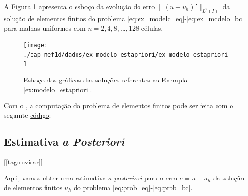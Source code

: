 \begin{ex}\label{ex:modelo_estapriori}
  A Figura \ref{fig:ex_modelo_estapriori} apresenta o esboço da evolução do erro $\|(u - u_h)'\|_{L^2(I)}$ da solução de elementos finitos do problema \eqref{eq:ex_modelo_eq}-\eqref{eq:ex_modelo_bc} para malhas uniformes com $n=2, 4, 8, \ldots, 128$ células.

\begin{figure}[h!]
  \centering
  \texttt{[image: ./cap\_mef1d/dados/ex\_modelo\_estapriori/ex\_modelo\_estapriori]}
  \caption{Esboço dos gráficos das soluções referentes ao Exemplo \ref{ex:modelo_estapriori}.}
  \label{fig:ex_modelo_estapriori}
\end{figure}

\ifispython
Com o \fenics, a computação do problema de elementos finitos pode ser feita com o seguinte \href{https://github.com/phkonzen/notas/blob/master/src/MetodoElementosFinitos/cap_mef1d/dados/ex_modelo_estapriori/ex_modelo_estapriori.py}{código}:

\fi
\end{ex}

\subsection{Estimativa \textit{a Posteriori}}
[[tag:revisar]]

Aqui, vamos obter uma estimativa \textit{a posteriori} para o erro $e = u - u_h$ da solução de elementos finitos $u_h$ do problema \eqref{eq:prob_eq}-\eqref{eq:prob_bc}.

